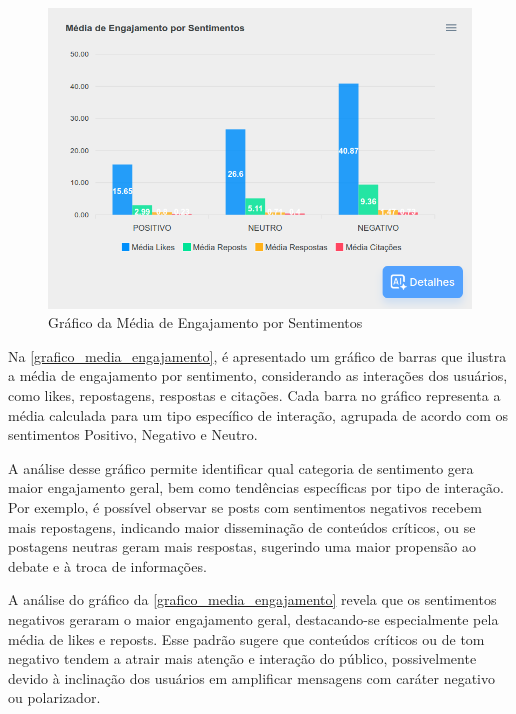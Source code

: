 \documentclass[
	12pt,				%
	oneside,			%
	a4paper,			%
	english,			%
	french,				%
	spanish,			%
	brazil				%
	]{abntex2}
\begin{document}
\begin{figure}[htbp]
\hypertarget{grafico_media_engajamento}{%
\caption{Gráfico da Média de Engajamento por Sentimentos}\label{grafico_media_engajamento}
\begin{center}
\includegraphics[scale=0.3]{imagens/sentilytics/estudo-caso/media_engajamento_por_sentimento.png}
\end{center}
}
\end{figure}

Na \autoref{grafico_media_engajamento}, é apresentado um gráfico de
barras que ilustra a média de engajamento por sentimento, considerando
as interações dos usuários, como likes, repostagens, respostas e
citações. Cada barra no gráfico representa a média calculada para um
tipo específico de interação, agrupada de acordo com os sentimentos
Positivo, Negativo e Neutro.

A análise desse gráfico permite identificar qual categoria de sentimento
gera maior engajamento geral, bem como tendências específicas por tipo
de interação. Por exemplo, é possível observar se posts com sentimentos
negativos recebem mais repostagens, indicando maior disseminação de
conteúdos críticos, ou se postagens neutras geram mais respostas,
sugerindo uma maior propensão ao debate e à troca de informações.

A análise do gráfico da \autoref{grafico_media_engajamento} revela que
os sentimentos negativos geraram o maior engajamento geral,
destacando-se especialmente pela média de likes e reposts. Esse padrão
sugere que conteúdos críticos ou de tom negativo tendem a atrair mais
atenção e interação do público, possivelmente devido à inclinação dos
usuários em amplificar mensagens com caráter negativo ou polarizador.
\end{document}
